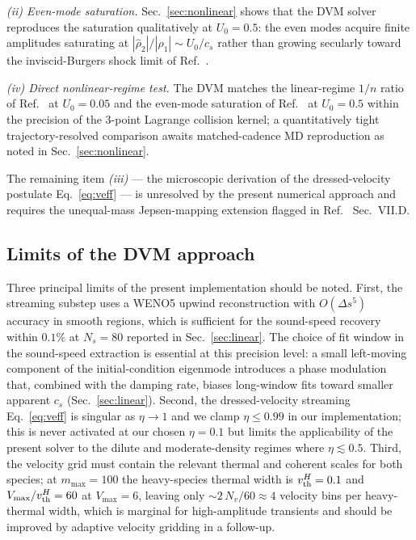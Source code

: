 \documentclass[aps,pre,twocolumn,superscriptaddress,longbibliography,floatfix]{revtex4-2}
\begin{document}
\emph{(ii) Even-mode saturation.} Sec.~\ref{sec:nonlinear}
shows that the DVM solver reproduces the saturation
qualitatively at $U_0=0.5$: the even modes acquire finite
amplitudes saturating at
$|\hat\rho_2|/|\hat\rho_1|\sim U_0/c_s$ rather than growing
secularly toward the inviscid-Burgers shock limit of
Ref.~\cite{PaperIII}.

\emph{(iv) Direct nonlinear-regime test.} The DVM matches
the linear-regime $1/n$ ratio of Ref.~\cite{PaperIV} at
$U_0=0.05$ and the even-mode saturation of
Ref.~\cite{PaperIII} at $U_0=0.5$ within the precision of
the 3-point Lagrange collision kernel; a quantitatively
tight trajectory-resolved comparison awaits matched-cadence
MD reproduction as noted in Sec.~\ref{sec:nonlinear}.

The remaining item \emph{(iii)} --- the microscopic
derivation of the dressed-velocity postulate
Eq.~\eqref{eq:veff} --- is unresolved by the present
numerical approach and requires the
unequal-mass Jepsen-mapping extension flagged in
Ref.~\cite{PaperIV} Sec.~VII.D.

\subsection{Limits of the DVM approach}

Three principal limits of the present implementation should
be noted. First, the streaming substep uses a WENO5
upwind reconstruction with $O(\Delta s^5)$ accuracy in
smooth regions, which is sufficient for the sound-speed
recovery within $0.1\%$ at $N_s=80$ reported in
Sec.~\ref{sec:linear}. The choice of fit window in the
sound-speed extraction is essential at this precision
level: a small left-moving component of the
initial-condition eigenmode introduces a phase modulation
that, combined with the damping rate, biases long-window
fits toward smaller apparent $c_s$
(Sec.~\ref{sec:linear}).
Second, the dressed-velocity streaming Eq.~\eqref{eq:veff} is
singular as $\eta\to 1$ and we clamp $\eta\leq 0.99$ in our
implementation; this is never activated at our chosen
$\eta=0.1$ but limits the applicability of the present
solver to the dilute and moderate-density regimes where
$\eta\lesssim 0.5$.
Third, the velocity grid must contain the relevant thermal
and coherent scales for both species; at $m_{\max}=100$ the
heavy-species thermal width is $v_{\rm th}^H=0.1$ and
$V_{\max}/v_{\rm th}^H=60$ at $V_{\max}=6$, leaving only
$\sim 2\,N_v/60\approx 4$ velocity bins per heavy-thermal
width, which is marginal for high-amplitude transients and
should be improved by adaptive velocity gridding in a
follow-up.
\end{document}
